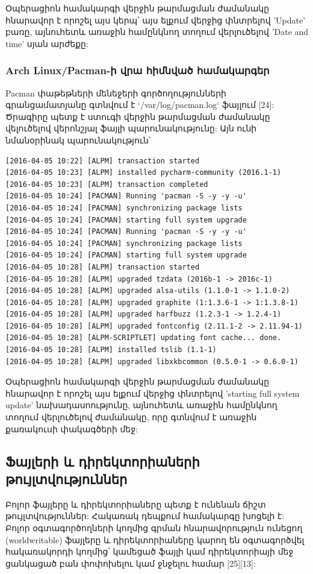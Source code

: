 \documentclass[a4paper,12pt]{article}
\begin{document}
\begin{sloppypar}
Օպերացիոն համակարգի վերջին թարմացման ժամանակը հնարավոր է որոշել այս կերպ՝
այս ելքում վերջից փնտրելով 'Update' բառը, այնուհետև
առաջին համընկնող տողում վերլուծելով 'Date and time' սյան արժեքը:

\subsubsection{Arch Linux/Pacman-ի վրա հիմնված համակարգեր}

Pacman փաթեթների մենեջերի գործողությունների գրանցամատյանը
գտնվում է `/var/log/pacman.log` ֆայլում [24]: Ծրագիրը պետք է ստուգի
վերջին թարմացման ժամանակը վելուծելով վերոնշյալ ֆայլի պարունակությունը:
Այն ունի նմանօրինակ պարունակություն՝

\begin{lstlisting}[language={}]
[2016-04-05 10:22] [ALPM] transaction started
[2016-04-05 10:23] [ALPM] installed pycharm-community (2016.1-1)
[2016-04-05 10:23] [ALPM] transaction completed
[2016-04-05 10:24] [PACMAN] Running 'pacman -S -y -y -u'
[2016-04-05 10:24] [PACMAN] synchronizing package lists
[2016-04-05 10:24] [PACMAN] starting full system upgrade
[2016-04-05 10:24] [PACMAN] Running 'pacman -S -y -y -u'
[2016-04-05 10:24] [PACMAN] synchronizing package lists
[2016-04-05 10:24] [PACMAN] starting full system upgrade
[2016-04-05 10:28] [ALPM] transaction started
[2016-04-05 10:28] [ALPM] upgraded tzdata (2016b-1 -> 2016c-1)
[2016-04-05 10:28] [ALPM] upgraded alsa-utils (1.1.0-1 -> 1.1.0-2)
[2016-04-05 10:28] [ALPM] upgraded graphite (1:1.3.6-1 -> 1:1.3.8-1)
[2016-04-05 10:28] [ALPM] upgraded harfbuzz (1.2.3-1 -> 1.2.4-1)
[2016-04-05 10:28] [ALPM] upgraded fontconfig (2.11.1-2 -> 2.11.94-1)
[2016-04-05 10:28] [ALPM-SCRIPTLET] updating font cache... done.
[2016-04-05 10:28] [ALPM] installed tslib (1.1-1)
[2016-04-05 10:28] [ALPM] upgraded libxkbcommon (0.5.0-1 -> 0.6.0-1)
\end{lstlisting}

Օպերացիոն համակարգի վերջին թարմացման ժամանակը հնարավոր է որոշել
այս ելքում վերջից փնտրելով 'starting full system update' նախադասոությունը,
այնուհետև առաջին համընկնող տողում վերլուծելով ժամանակը, որը գտնվում է
առաջին քառակուսի փակագծերի մեջ:


\subsection{Ֆայլերի և դիրեկտորիաների թույլտվություններ}


Բոլոր ֆայլերը և դիրեկտորիաները պետք է ունենան ճիշտ թույլտվություններ:
Հակառակ դեպքում համակարգը խոցելի է:
Բոլոր օգտագործողների կողմից գրման հնարավորություն ունեցող (worldwritable)
ֆայլերը և դիրեկտորիաները կարող են օգտագործվել հակառակորդի կողմից՝
կամեցած ֆայլի կամ դիրեկտորիայի մեջ ցանկացած բան փոփոխելու կամ ջնջելու
համար [25][13]:


\end{sloppypar}
\end{document}
